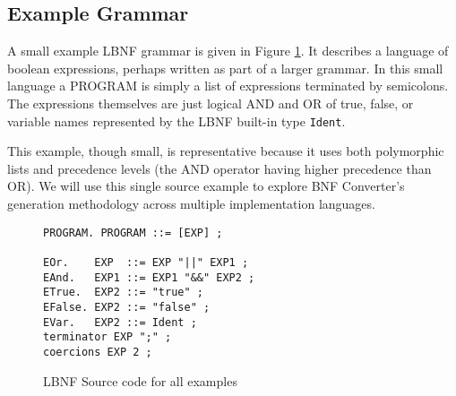 \subsection{Example Grammar}
\label{example}


A small example LBNF grammar is given in Figure \ref{fig:source}. It describes a language of boolean expressions, perhaps written as part of a larger grammar. In this small language a PROGRAM is simply a list of expressions terminated by semicolons. The expressions themselves are just logical AND and OR of true, false, or variable names represented by the LBNF built-in type \texttt{Ident}.

This example, though small, is representative because it uses both polymorphic lists and precedence levels (the AND operator having higher precedence than OR). We will use this single source example to explore BNF Converter's generation methodology across multiple implementation languages.

\begin{figure}
\begin{center}
\begin{boxedminipage}[t]{6.3cm}
\begin{verbatim}
PROGRAM. PROGRAM ::= [EXP] ;

EOr.    EXP  ::= EXP "||" EXP1 ;
EAnd.   EXP1 ::= EXP1 "&&" EXP2 ;
ETrue.  EXP2 ::= "true" ;
EFalse. EXP2 ::= "false" ;
EVar.   EXP2 ::= Ident ;
terminator EXP ";" ;
coercions EXP 2 ;
\end{verbatim}
\end{boxedminipage}
\end{center}
\caption{LBNF Source code for all examples}
\label{fig:source}
\end{figure}
